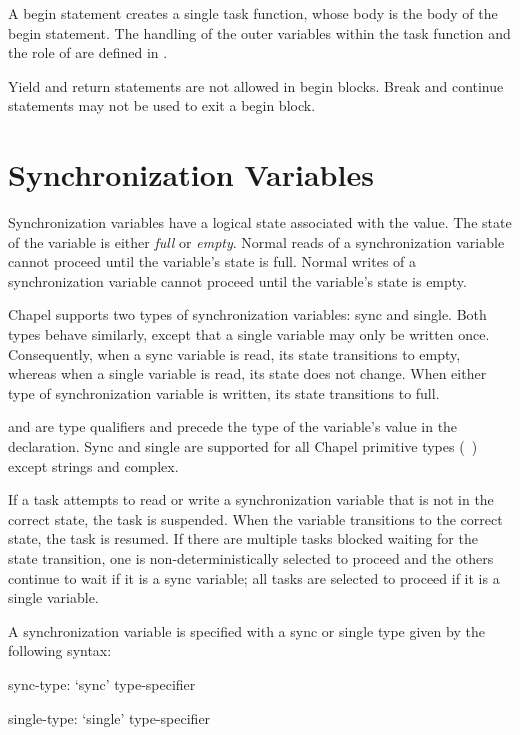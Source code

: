 A begin statement creates a single task function,
whose body is the body of the begin statement.
The handling of the outer variables within the task function and
the role of  are defined in .

Yield and return statements are not allowed in begin blocks.  Break
and continue statements may not be used to exit a begin block.

%
%

\section{Synchronization Variables}
\label{Synchronization_Variables}

Synchronization variables have a logical state associated with the
value.  The state of the variable is either {\em full} or {\em empty}.
Normal reads of a synchronization variable cannot proceed until the
variable's state is full.  Normal writes of a synchronization variable
cannot proceed until the variable's state is empty.

Chapel supports two types of synchronization variables: sync and
single.  Both types behave similarly, except that a single variable
may only be written once.  Consequently, when a sync variable is read,
its state transitions to empty, whereas when a single variable is
read, its state does not change.  When either type of synchronization
variable is written, its state transitions to full.

 and  are type qualifiers and precede
the type of the variable's value in
the declaration.  Sync and single are supported for all Chapel
primitive types (~) except strings and complex.

If a task attempts to read or write a synchronization variable that is
not in the correct state, the task is suspended.  When the variable
transitions to the correct state, the task is resumed.  If there are
multiple tasks blocked waiting for the state transition, one is
non-deterministically selected to proceed and the others continue to
wait if it is a sync variable; all tasks are selected to proceed
if it is a single variable.

A synchronization variable is specified with a sync or single type
given by the following syntax:
\begin{syntax}
sync-type:
  `sync' type-specifier

single-type:
  `single' type-specifier
\end{syntax}

